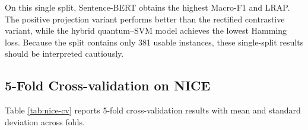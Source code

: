 \documentclass[runningheads]{llncs}
\begin{document}
\begin{table}[htbp]
\centering
\caption{NICE multi-label results on a single train/validation/test split, comparing label-frequency, TF-IDF, Sentence-BERT, and quantum-inspired models across Micro-F1, Macro-F1, Hamming loss, and LRAP. Sentence-BERT has the highest Macro-F1 and LRAP on this split; the hybrid quantum--SVM model obtains the lowest Hamming loss.}
\label{tab:nice-single}
\end{table}

On this single split, Sentence-BERT obtains the highest Macro-F1 and LRAP. The
positive projection variant performs better than the rectified contrastive
variant, while the hybrid quantum--SVM model achieves the lowest Hamming loss.
Because the split contains only 381 usable instances, these single-split
results should be interpreted cautiously.

\subsection{5-Fold Cross-validation on NICE}
Table \ref{tab:nice-cv} reports 5-fold cross-validation results with mean and
standard deviation across folds.
\end{document}
